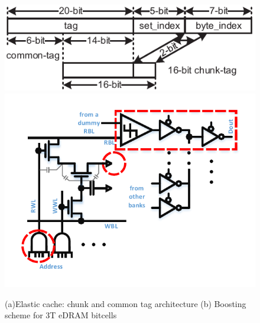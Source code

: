 \begin{figure}
\center
\includegraphics[width=0.4\linewidth]{./fig/chunk_tag_16bit-eps-converted-to.pdf}
\includegraphics[width=0.3\linewidth]{./fig/boosting.pdf}
\caption{(a)Elastic cache: chunk and common tag architecture (b) Boosting scheme for 3T eDRAM bitcells}
\label{fig:elastic-cache}
\end{figure}

